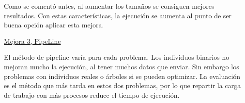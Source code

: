 %			
%			
%			
%			
%			
%		
%		


Como se comentó antes, al aumentar los tamaños se consiguen mejores resultados. Con estas características, la ejecución se aumenta al punto de ser buena opción aplicar esta mejora.

\underline{Mejora 3, PipeLine}

El método de pipeline varía para cada problema. Los individuos binarios no mejoran mucho la ejecución, al tener muchos datos que enviar. Sin embargo los problemas con individuos reales o árboles si se pueden optimizar. La evaluación es el método que más tarda en estos dos problemas, por lo que repartir la carga de trabajo con más procesos reduce el tiempo de ejecución.


